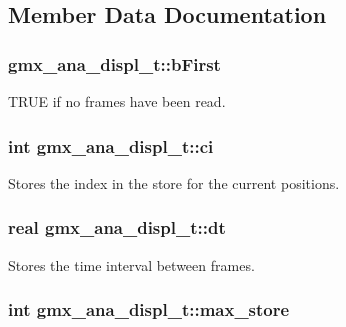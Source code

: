 \subsection{\-Member \-Data \-Documentation}
\hypertarget{structgmx__ana__displ__t_abdd1c7845e00a75c75d97765a602c984}{
\subsubsection[{b\-First}]{ {\bf gmx\-\_\-ana\-\_\-displ\-\_\-t\-::b\-First}}}\label{structgmx__ana__displ__t_abdd1c7845e00a75c75d97765a602c984}
\-T\-R\-U\-E if no frames have been read. \hypertarget{structgmx__ana__displ__t_a41747bd4bed296a4811811a8e5e576da}{
\subsubsection[{ci}]{\setlength{\rightskip}{0pt plus 5cm}int {\bf gmx\-\_\-ana\-\_\-displ\-\_\-t\-::ci}}}\label{structgmx__ana__displ__t_a41747bd4bed296a4811811a8e5e576da}
\-Stores the index in the store for the current positions. \hypertarget{structgmx__ana__displ__t_ae064c1c3553ab6976a5918c261dbdd19}{
\subsubsection[{dt}]{\setlength{\rightskip}{0pt plus 5cm}real {\bf gmx\-\_\-ana\-\_\-displ\-\_\-t\-::dt}}}\label{structgmx__ana__displ__t_ae064c1c3553ab6976a5918c261dbdd19}
\-Stores the time interval between frames. \hypertarget{structgmx__ana__displ__t_adfa23f16e006650eca65638b279629f5}{
\subsubsection[{max\-\_\-store}]{\setlength{\rightskip}{0pt plus 5cm}int {\bf gmx\-\_\-ana\-\_\-displ\-\_\-t\-::max\-\_\-store}}}\label{structgmx__ana__displ__t_adfa23f16e006650eca65638b279629f5}
